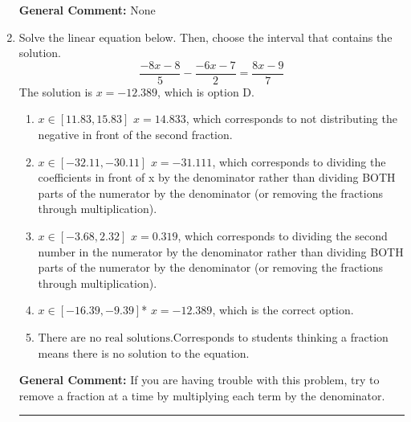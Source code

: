 \documentclass{extbook}[14pt]
\newcommand{\litem}[1]{\item#1\hspace*{-1cm}\rule{\textwidth}{0.4pt}}
\begin{document}
\begin{enumerate}
{\textbf{General Comment:} None
}
\litem{
Solve the linear equation below. Then, choose the interval that contains the solution.
\[ \frac{-8x -8}{5} - \frac{-6x -7}{2} = \frac{8x -9}{7} \]
The solution is \( x = -12.389 \), which is option D.\begin{enumerate}[label=\Alph*.]
\item \( x \in [11.83, 15.83] \) $x = 14.833$, which corresponds to not distributing the negative in front of the second fraction.
\item \( x \in [-32.11, -30.11] \) $x = -31.111$, which corresponds to dividing the coefficients in front of x by the denominator rather than dividing BOTH parts of the numerator by the denominator (or removing the fractions through multiplication).
\item \( x \in [-3.68, 2.32] \) $x = 0.319$, which corresponds to dividing the second number in the numerator by the denominator rather than dividing BOTH parts of the numerator by the denominator (or removing the fractions through multiplication).
\item \( x \in [-16.39, -9.39] \)* $x = -12.389$, which is the correct option.
\item \( \text{There are no real solutions.} \)Corresponds to students thinking a fraction means there is no solution to the equation.
\end{enumerate}

\textbf{General Comment:} If you are having trouble with this problem, try to remove a fraction at a time by multiplying each term by the denominator.
}
\end{enumerate}
\end{document}

